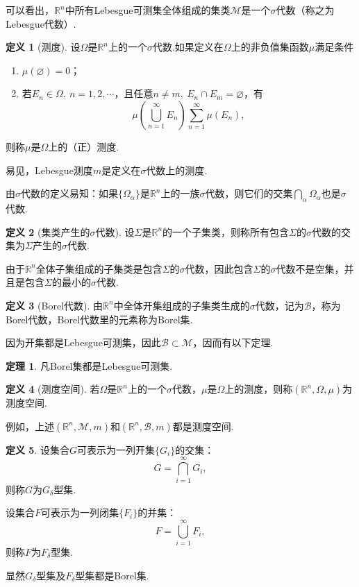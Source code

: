 \documentclass[lang=cn,12pt]{ctexart}
\theoremstyle{definition}
\newtheorem{definition}{定义}
\newtheorem{theorem}{定理}
\theoremstyle{plain}
\begin{document}
可以看出，$\mathbb{R}^n$中所有Lebesgue可测集全体组成的集类$\mathcal{M}$是一个$\sigma$代数（称之为Lebesgue代数）.
\begin{definition}[测度]
	设$\varOmega$是$\mathbb{R}^n$上的一个$\sigma$代数.如果定义在$\varOmega$上的非负值集函数$\mu$满足条件
	\begin{enumerate}
		\item $\mu(\varnothing)=0$；
		\item 若$E_n\in\varOmega,\ n=1,2,\cdots$，且任意$n\neq m,\ E_n\cap E_m=\varnothing$，有
		$$\mu\left(\bigcup_{n=1}^{\infty}E_n\right)\sum_{n=1}^{\infty}\mu(E_n),$$
	\end{enumerate}
	则称$\mu$是$\varOmega$上的{\heiti （正）测度}.
\end{definition}
易见，Lebesgue测度$m$是定义在$\sigma$代数上的测度.

由$\sigma$代数的定义易知：如果$\{\varOmega_{\alpha}\}$是$\mathbb{R}^n$上的一族$\sigma$代数，则它们的交集$\bigcap\limits_{\alpha}\varOmega_{\alpha}$也是$\sigma$代数.
\begin{definition}[集类产生的$\sigma$代数]
	设$\varSigma$是$\mathbb{R}^n$的一个子集类，则称所有包含$\varSigma$的$\sigma$代数的交集为$\varSigma$产生的$\sigma$代数.
\end{definition}
由于$\mathbb{R}^n$全体子集组成的子集类是包含$\varSigma$的$\sigma$代数，因此包含$\varSigma$的$\sigma$代数不是空集，并且是包含$\varSigma$的最小的$\sigma$代数.
\begin{definition}[Borel代数]
	由$\mathbb{R}^n$中全体开集组成的子集类生成的$\sigma$代数，记为$\mathcal{B}$，称为{\heiti Borel代数}，Borel代数里的元素称为{\heiti Borel集}.
\end{definition}
因为开集都是Lebesgue可测集，因此$\mathcal{B}\subset\mathcal{M}$，因而有以下定理.
\begin{theorem}
	凡Borel集都是Lebesgue可测集.
\end{theorem}
\begin{definition}[测度空间]
	若$\varOmega$是$\mathbb{R}^n$上的一个$\sigma$代数，$\mu$是$\varOmega$上的测度，则称$(\mathbb{R}^n,\varOmega,\mu)$为{\heiti 测度空间}.
\end{definition}
例如，上述$(\mathbb{R}^n,\mathcal{M},m)$和$(\mathbb{R}^n,\mathcal{B},m)$都是测度空间.
\begin{definition}
	设集合$G$可表示为一列开集$\{G_i\}$的交集：
	$$G=\bigcap\limits_{i=1}^{\infty}G_i,$$
	则称$G$为$G_{\delta}$型集.
	
	设集合$F$可表示为一列闭集$\{F_i\}$的并集：
	$$F=\bigcup\limits_{i=1}^{\infty}F_i,$$
	则称$F$为$F_{\delta}$型集.
\end{definition}
显然$G_{\delta}$型集及$F_{\delta}$型集都是Borel集.
\end{document}
